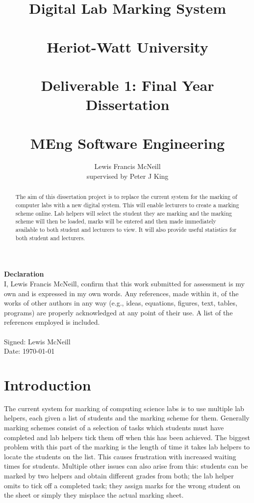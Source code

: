\documentclass[12pt]{article}  %
\title{Digital Lab Marking System \\~\\  \large{Heriot-Watt University} \\~\\ Deliverable 1: Final Year Dissertation \\~\\ MEng Software Engineering}
\author{Lewis Francis McNeill\\
supervised by
Peter J King}
\begin{document}
\maketitle
{}



\newpage
\setcounter{page}{1}
\doublespacing
\textbf{\Large{Declaration}} \\[2em]
I, Lewis Francis McNeill, confirm that this work submitted for assessment is my own and is expressed in my own words. Any references, made within it, of the works of other authors in any way (e.g., ideas, equations, figures, text, tables, programs) are properly acknowledged at any point of their use. A list of the references employed is included.
\\
\\
Signed: Lewis McNeill
\\
Date: \today


\newpage               
\begin{abstract}
\noindent
The aim of this dissertation project is to replace the current system for the marking of computer labs with a new digital system. This will enable lecturers to create a marking scheme online. Lab helpers will select the student they are marking and the marking scheme will then be loaded, marks will be entered and then made immediately available to both student and lecturers to view. It will also provide useful statistics for both student and lecturers.
\end{abstract}
\newpage 

\tableofcontents
\newpage
\listoffigures
\newpage
\listoftables
\lstlistoflistings


\newpage   
\setcounter{page}{1}
\section{Introduction}

The current system for marking of computing science labs is to use multiple lab helpers, each given a list of students and the marking scheme for them. Generally marking schemes consist of a selection of tasks which students must have completed and lab helpers tick them off when this has been achieved. The biggest problem with this part of the marking is the length of time it takes lab helpers to locate the students on the list. This causes frustration with increased waiting times for students.  Multiple other issues  can also  arise from this: students can be marked by two helpers and obtain different grades from both; the lab helper omits to  tick off a completed task; they assign  marks for the wrong student on the sheet or simply they misplace the actual marking sheet.
\end{document}
